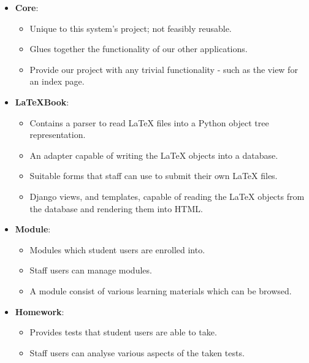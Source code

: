 		\begin{itemize}
			\item \textbf{Core}:
				\begin{itemize}
					\item Unique to this system's project; not feasibly reusable.
					\item Glues together the functionality of our other applications.
					\item Provide our project with any trivial functionality - such as the view for an index page.
				\end{itemize}

			\item \textbf{LaTeXBook}:
				\begin{itemize}
					\item Contains a parser to read LaTeX files into a Python object tree representation.
					\item An adapter capable of writing the LaTeX objects into a database.
					\item Suitable forms that staff can use to submit their own LaTeX files.
					\item Django views, and templates, capable of reading the LaTeX objects from the database and rendering them into HTML.
				\end{itemize}
				
			\item \textbf{Module}:
				\begin{itemize}
					\item Modules which student users are enrolled into.
					\item Staff users can manage modules.
					\item A module consist of various learning materials which can be browsed.
				\end{itemize} 

			\item \textbf{Homework}:
				\begin{itemize}
					\item Provides tests that student users are able to take.
					\item Staff users can analyse various aspects of the taken tests.
				\end{itemize} 
		\end{itemize}
